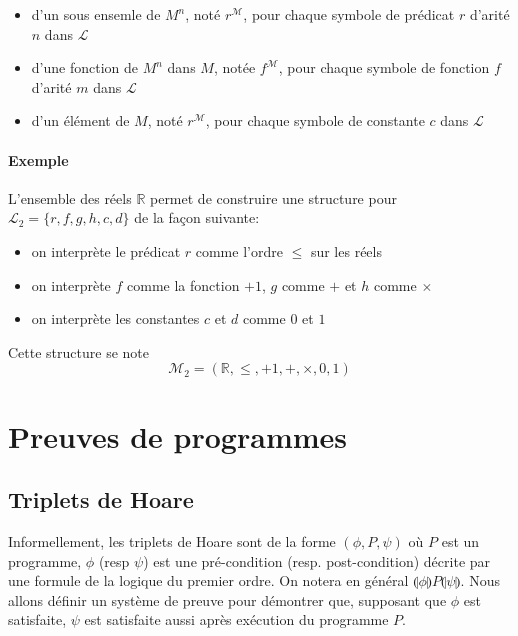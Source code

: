 \documentclass[a4paper]{article}
\begin{document}
   \begin{itemize}
     \item d'un sous ensemle de $M^n$, noté $r^{\mathcal{M}}$, pour chaque symbole
     de prédicat $r$ d'arité $n$ dans $\mathcal{L}$
     \item d'une fonction de $M^n$ dans $M$, notée $f^{\mathcal{M}}$, pour chaque symbole
     de fonction $f$ d'arité $m$ dans $\mathcal{L}$
     \item d'un élément de $M$, noté $r^{\mathcal{M}}$, pour chaque symbole de 
     constante $c$ dans $\mathcal{L}$
   \end{itemize}

   \paragraph{Exemple} L'ensemble des réels $\mathbb{R}$ permet de construire une 
   structure pour $\mathcal{L}_2 = \{r, f, g, h, c, d\}$ de la façon suivante:

   \begin{itemize}
     \item on interprète le prédicat $r$ comme l'ordre $\leq$ sur les réels
     \item on interprète $f$ comme la fonction $+1$, $g$ comme $+$ et $h$ comme $\times$
     \item on interprète les constantes $c$ et $d$ comme $0$ et $1$
   \end{itemize}
   Cette structure se note $$ \mathcal{M}_2 = (\mathbb{R}, \leq, +1, +, \times, 0, 1) $$ 


\section{Preuves de programmes}
  \subsection{Triplets de Hoare}
  Informellement, les triplets de Hoare sont de la forme $(\phi, P, \psi)$ où $P$
  est un programme, $\phi$ (resp $\psi$) est une pré-condition (resp. post-condition) 
  décrite par une formule de la logique du premier ordre. On notera en général $\llparenthesis \phi\rrparenthesis P \llparenthesis \psi\rrparenthesis $.
  Nous allons définir un système de preuve pour démontrer que, supposant que $\phi$
  est satisfaite, $\psi$ est satisfaite aussi après exécution du programme $P$.
\end{document}
